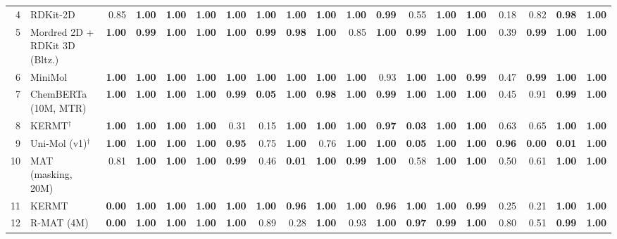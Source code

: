 \documentclass{article}
\begin{document}
\begin{table}[H]
{\begin{tabular}{@{}rlrrrrrrrrrrrrrrrrr@{}}
4 & RDKit-2D & 0.85 & \textbf{1.00} & \textbf{1.00} & \textbf{1.00} & \textbf{1.00} & \textbf{1.00} & \textbf{1.00} & \textbf{1.00} & \textbf{1.00} & \textbf{0.99} & 0.55 & \textbf{1.00} & \textbf{1.00} & 0.18 & 0.82 & \textbf{0.98} & \textbf{1.00} \\
5 & Mordred 2D + RDKit 3D (Bltz.) & \textbf{1.00} & \textbf{0.99} & \textbf{1.00} & \textbf{1.00} & \textbf{1.00} & \textbf{0.99} & \textbf{0.98} & \textbf{1.00} & 0.85 & \textbf{1.00} & \textbf{0.99} & \textbf{1.00} & \textbf{1.00} & 0.39 & \textbf{0.99} & \textbf{1.00} & \textbf{1.00} \\
6 & MiniMol & \textbf{1.00} & \textbf{1.00} & \textbf{1.00} & \textbf{1.00} & \textbf{1.00} & \textbf{1.00} & \textbf{1.00} & \textbf{1.00} & \textbf{1.00} & 0.93 & \textbf{1.00} & \textbf{1.00} & \textbf{0.99} & 0.47 & \textbf{0.99} & \textbf{1.00} & \textbf{1.00} \\
7 & ChemBERTa (10M, MTR) & \textbf{1.00} & \textbf{1.00} & \textbf{1.00} & \textbf{1.00} & \textbf{0.99} & \textbf{0.05} & \textbf{1.00} & \textbf{0.98} & \textbf{1.00} & \textbf{0.99} & \textbf{1.00} & \textbf{1.00} & \textbf{1.00} & 0.45 & 0.91 & \textbf{0.99} & \textbf{1.00} \\
8 & KERMT$^\dagger$ & \textbf{1.00} & \textbf{1.00} & \textbf{1.00} & \textbf{1.00} & 0.31 & 0.15 & \textbf{1.00} & \textbf{1.00} & \textbf{1.00} & \textbf{0.97} & \textbf{0.03} & \textbf{1.00} & \textbf{1.00} & 0.63 & 0.65 & \textbf{1.00} & \textbf{1.00} \\
9 & Uni-Mol (v1)$^\dagger$ & \textbf{1.00} & \textbf{1.00} & \textbf{1.00} & \textbf{1.00} & \textbf{0.95} & 0.75 & \textbf{1.00} & 0.76 & \textbf{1.00} & \textbf{1.00} & \textbf{0.05} & \textbf{1.00} & \textbf{1.00} & \textbf{0.96} & \textbf{0.00} & \textbf{0.01} & \textbf{1.00} \\
10 & MAT (masking, 20M) & 0.81 & \textbf{1.00} & \textbf{1.00} & \textbf{1.00} & \textbf{0.99} & 0.46 & \textbf{0.01} & \textbf{1.00} & \textbf{0.99} & \textbf{1.00} & 0.58 & \textbf{1.00} & \textbf{1.00} & 0.50 & 0.61 & \textbf{1.00} & \textbf{1.00} \\
11 & KERMT & \textbf{0.00} & \textbf{1.00} & \textbf{1.00} & \textbf{1.00} & \textbf{1.00} & \textbf{1.00} & \textbf{0.96} & \textbf{1.00} & \textbf{1.00} & \textbf{0.96} & \textbf{1.00} & \textbf{1.00} & \textbf{0.99} & 0.25 & 0.21 & \textbf{1.00} & \textbf{1.00} \\
12 & R-MAT (4M) & \textbf{0.00} & \textbf{1.00} & \textbf{1.00} & \textbf{1.00} & \textbf{1.00} & 0.89 & 0.28 & \textbf{1.00} & 0.93 & \textbf{1.00} & \textbf{0.97} & \textbf{0.99} & \textbf{1.00} & 0.80 & 0.51 & \textbf{0.99} & \textbf{1.00} \\

\end{tabular}}
\end{table}
\end{document}
